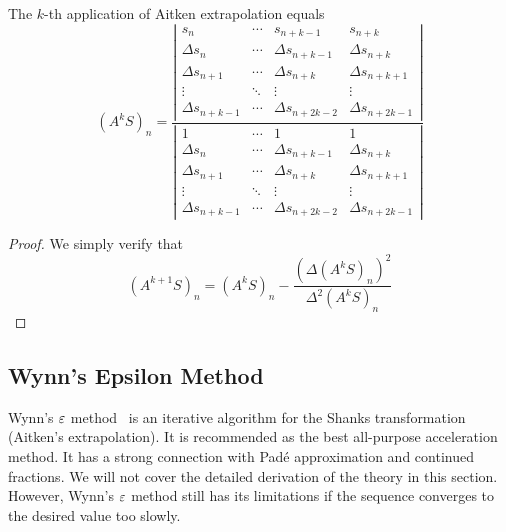 \begin{theorem}
The $k$-th application of Aitken extrapolation equals
    \begin{equation}
        (A^k S)_n = \frac{\left|\begin{matrix}
            s_{n} & \cdots & s_{n+k-1} & s_{n+k} \\
            \Delta s_{n} & \cdots & \Delta s_{n+k-1} & \Delta s_{n+k} \\
             \Delta s_{n+1} & \cdots & \Delta s_{n+k} & \Delta s_{n+k+1} \\
            \vdots & \ddots & \vdots & \vdots \\
            \Delta s_{n+k-1} & \cdots & \Delta s_{n+2k-2} & \Delta s_{n+2k-1}
        \end{matrix}\right|}{\left|\begin{matrix}
            1 & \cdots & 1 & 1 \\
               \Delta s_{n} & \cdots & \Delta s_{n+k-1} & \Delta s_{n+k} \\
             \Delta s_{n+1} & \cdots & \Delta s_{n+k} & \Delta s_{n+k+1} \\
            \vdots & \ddots & \vdots & \vdots \\
            \Delta s_{n+k-1} & \cdots & \Delta s_{n+2k-2} & \Delta s_{n+2k-1}
        \end{matrix}\right|}
    \end{equation}
\end{theorem}
\begin{proof}
    We simply verify that 
    \begin{equation}
          (A^{k+1} S)_n =  (A^{k} S)_n - \frac{(\Delta  (A^{k} S)_n)^2 }{\Delta^2  (A^{k} S)_n } 
    \end{equation}
\end{proof}
\subsection{Wynn's Epsilon Method}
\label{SSec: 3-Wynn-Eps-Met}
Wynn's $\varepsilon$ method~\cite{wynn1956device,wynn1966convergence} is an iterative algorithm for the Shanks transformation (Aitken's extrapolation). It is recommended as the best all-purpose acceleration method. It has a strong connection with Pad\'e approximation and continued fractions. We will not cover the detailed derivation of the theory in this section. However, Wynn's $\varepsilon$ method still has its limitations if the sequence converges to the desired value too slowly. 

